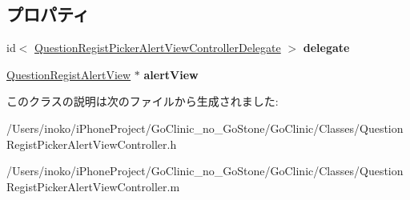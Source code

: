\subsection*{プロパティ}
\begin{DoxyCompactItemize}
\item 
\hypertarget{interface_question_regist_picker_alert_view_controller_a78ad86809b24919a0668a3910d9d9e33}{
id$<$ \hyperlink{protocol_question_regist_picker_alert_view_controller_delegate-p}{QuestionRegistPickerAlertViewControllerDelegate} $>$ {\bfseries delegate}}
\label{interface_question_regist_picker_alert_view_controller_a78ad86809b24919a0668a3910d9d9e33}

\item 
\hypertarget{interface_question_regist_picker_alert_view_controller_a99b31f2bf632c7eb36b64cf6c573f3f7}{
\hyperlink{interface_question_regist_alert_view}{QuestionRegistAlertView} $\ast$ {\bfseries alertView}}
\label{interface_question_regist_picker_alert_view_controller_a99b31f2bf632c7eb36b64cf6c573f3f7}

\end{DoxyCompactItemize}


このクラスの説明は次のファイルから生成されました:\begin{DoxyCompactItemize}
\item 
/Users/inoko/iPhoneProject/GoClinic\_\-no\_\-GoStone/GoClinic/Classes/QuestionRegistPickerAlertViewController.h\item 
/Users/inoko/iPhoneProject/GoClinic\_\-no\_\-GoStone/GoClinic/Classes/QuestionRegistPickerAlertViewController.m\end{DoxyCompactItemize}
